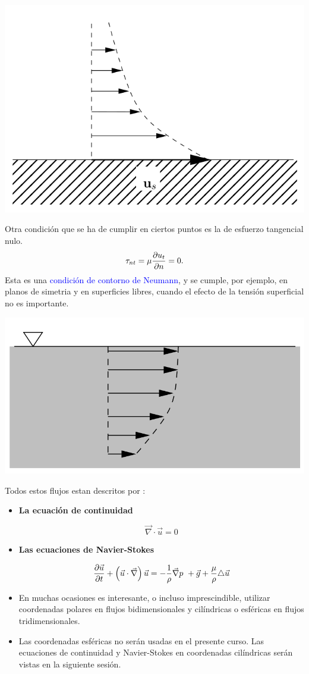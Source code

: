 \begin{center}
	\includegraphics[width=0.5\linewidth]{TeX_files/chapter05-FlujoViscoco/no-slip}
\end{center}


			Otra condición que se ha de cumplir en ciertos puntos es la de esfuerzo
			tangencial nulo. 
			\[
			\tau_{nt}=\mu\frac{\partial u_{t}}{\partial n}=0.
			\]
			Esta es una \textcolor{blue}{condición de contorno de Neumann}, y
			se cumple, por ejemplo, en planos de simetria y en superficies libres,
			cuando el efecto de la tensión superficial no es importante. %
\begin{center}
	\includegraphics[width=0.5\linewidth]{TeX_files/chapter05-FlujoViscoco/sup_libre}
\end{center}

	
	Todos estos flujos estan descritos por : 
	\begin{itemize}
		\item \textbf{La ecuación de continuidad} 
		
		\begin{equation}
			\vec{\nabla}\cdot\vec{u}=0
		\end{equation}
		
		
		\item \textbf{Las ecuaciones de Navier-Stokes} 
		
		\begin{equation}
			\dparc{\vec{u}}{t}+\left(\vec{u}\cdot\vec{\nabla}\right)\vec{u}=-\dfrac{1}{\rho}\vec{\nabla}p\ +\vec{g}+\dfrac{\mu}{\rho}\triangle\vec{u}
		\end{equation}
		
		
		\item En muchas ocasiones es interesante, o incluso imprescindible, utilizar
		coordenadas polares en flujos bidimensionales y cilíndricas o esféricas
		en flujos tridimensionales.
		\item Las coordenadas esféricas no serán usadas en el presente curso. Las
		ecuaciones de continuidad y Navier-Stokes en coordenadas cilíndricas
		serán vistas en la siguiente sesión.
	\end{itemize}

